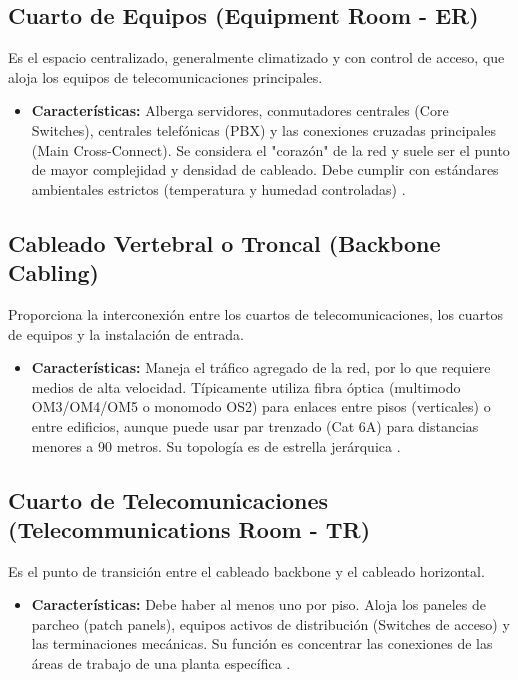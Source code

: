 \documentclass[a4paper,12pt]{article}
\begin{document}
\subsection{Cuarto de Equipos (Equipment Room - ER)}
Es el espacio centralizado, generalmente climatizado y con control de acceso, que aloja los equipos de telecomunicaciones principales.
\begin{itemize}
    \item \textbf{Características:} Alberga servidores, conmutadores centrales (Core Switches), centrales telefónicas (PBX) y las conexiones cruzadas principales (Main Cross-Connect). Se considera el "corazón" de la red y suele ser el punto de mayor complejidad y densidad de cableado. Debe cumplir con estándares ambientales estrictos (temperatura y humedad controladas) \cite{secproo}.
\end{itemize}

\subsection{Cableado Vertebral o Troncal (Backbone Cabling)}
Proporciona la interconexión entre los cuartos de telecomunicaciones, los cuartos de equipos y la instalación de entrada.
\begin{itemize}
    \item \textbf{Características:} Maneja el tráfico agregado de la red, por lo que requiere medios de alta velocidad. Típicamente utiliza fibra óptica (multimodo OM3/OM4/OM5 o monomodo OS2) para enlaces entre pisos (verticales) o entre edificios, aunque puede usar par trenzado (Cat 6A) para distancias menores a 90 metros. Su topología es de estrella jerárquica \cite{commscope}.
\end{itemize}

\subsection{Cuarto de Telecomunicaciones (Telecommunications Room - TR)}
Es el punto de transición entre el cableado backbone y el cableado horizontal.
\begin{itemize}
    \item \textbf{Características:} Debe haber al menos uno por piso. Aloja los paneles de parcheo (patch panels), equipos activos de distribución (Switches de acceso) y las terminaciones mecánicas. Su función es concentrar las conexiones de las áreas de trabajo de una planta específica \cite{udenar}.
\end{itemize}
\end{document}
